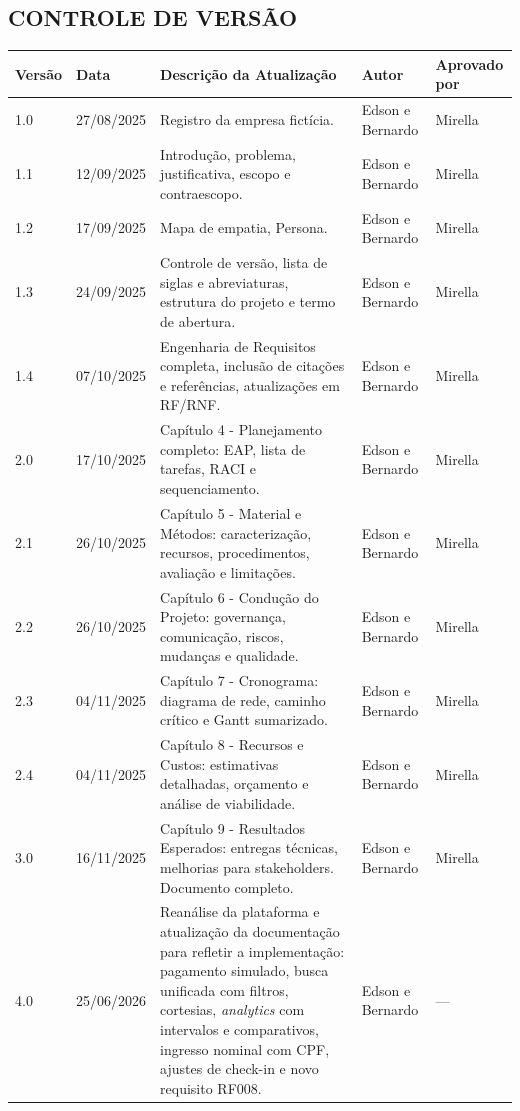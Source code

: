 \begin{center}
\Large
\section*{CONTROLE DE VERSÃO}
\end{center}

\begin{center}
\scriptsize
\begin{tabular}{|p{1.2cm}|p{1.7cm}|p{5.3cm}|p{2.1cm}|p{1.7cm}|}
\hline
\textbf{Versão} & \textbf{Data} & \textbf{Descrição da Atualização} & \textbf{Autor} & \textbf{Aprovado por} \\ \hline
1.0 & 27/08/2025 & Registro da empresa fictícia. & Edson e Bernardo & Mirella \\ \hline
1.1 & 12/09/2025 & Introdução, problema, justificativa, escopo e contraescopo. & Edson e Bernardo & Mirella \\ \hline
1.2 & 17/09/2025 & Mapa de empatia, Persona. & Edson e Bernardo & Mirella \\ \hline
1.3 & 24/09/2025 & Controle de versão, lista de siglas e abreviaturas, estrutura do projeto e termo de abertura. & Edson e Bernardo & Mirella \\ \hline
1.4 & 07/10/2025 & Engenharia de Requisitos completa, inclusão de citações e referências, atualizações em RF/RNF. & Edson e Bernardo & Mirella \\ \hline
2.0 & 17/10/2025 & Capítulo 4 - Planejamento completo: EAP, lista de tarefas, RACI e sequenciamento. & Edson e Bernardo & Mirella \\ \hline
2.1 & 26/10/2025 & Capítulo 5 - Material e Métodos: caracterização, recursos, procedimentos, avaliação e limitações. & Edson e Bernardo & Mirella \\ \hline
2.2 & 26/10/2025 & Capítulo 6 - Condução do Projeto: governança, comunicação, riscos, mudanças e qualidade. & Edson e Bernardo & Mirella \\ \hline
2.3 & 04/11/2025 & Capítulo 7 - Cronograma: diagrama de rede, caminho crítico e Gantt sumarizado. & Edson e Bernardo & Mirella \\ \hline
2.4 & 04/11/2025 & Capítulo 8 - Recursos e Custos: estimativas detalhadas, orçamento e análise de viabilidade. & Edson e Bernardo & Mirella \\ \hline
3.0 & 16/11/2025 & Capítulo 9 - Resultados Esperados: entregas técnicas, melhorias para stakeholders. Documento completo. & Edson e Bernardo & Mirella \\ \hline
4.0 & 25/06/2026 & Reanálise da plataforma e atualização da documentação para refletir a implementação: pagamento simulado, busca unificada com filtros, cortesias, \textit{analytics} com intervalos e comparativos, ingresso nominal com CPF, ajustes de check-in e novo requisito RF008. & Edson e Bernardo & --- \\ \hline
\end{tabular}
\end{center}
